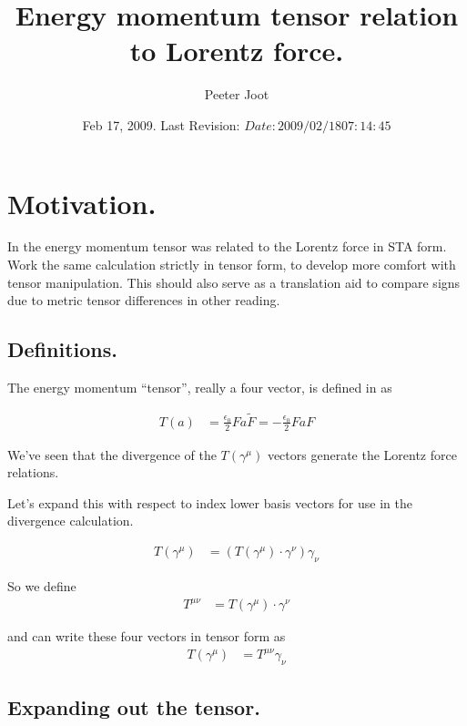 \documentclass{article}
\title{ Energy momentum tensor relation to Lorentz force. }
\author{Peeter Joot}
\date{ Feb 17, 2009.  Last Revision: $Date: 2009/02/18 07:14:45 $ }
\begin{document}
\maketitle{}

\section{ Motivation. }

In \cite{PJstressEnergyLorentz} the energy momentum tensor was related
to the Lorentz force in STA form.  Work the same calculation strictly in
tensor form, to
develop more comfort with tensor manipulation.  This should also serve
as a translation aid to compare signs due to metric tensor differences 
in other reading.

\subsection{ Definitions. }

The energy momentum ``tensor'', really a four vector, is defined
in \cite{doran2003gap}
as

\begin{align}
T(a) &= 
\frac{\epsilon_0}{2} F a \tilde{F} = -\frac{\epsilon_0}{2} F a {F} 
\end{align}

We've seen that the divergence of the $T(\gamma^\mu)$ vectors generate
the Lorentz force relations.

Let's expand this with respect to index lower basis vectors for use in the
divergence calculation.

\begin{align}
T(\gamma^\mu) &= (T(\gamma^\mu) \cdot \gamma^\nu) \gamma_\nu 
\end{align}

So we define
\begin{align}
T^{\mu \nu} 
&= T(\gamma^\mu) \cdot \gamma^\nu
\end{align}

and can write these four vectors in tensor form as
\begin{align}
T(\gamma^\mu) &= T^{\mu \nu} \gamma_\nu 
\end{align}

\subsection{ Expanding out the tensor. }
\end{document}
